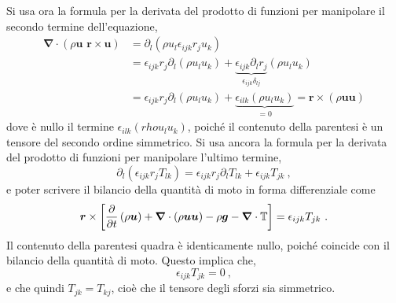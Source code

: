 \noindent
Si usa ora la formula per la derivata del prodotto di funzioni per manipolare il secondo termine dell'equazione,
\begin{equation}
\begin{aligned}
  \bm{\nabla} \cdot \left( \rho \bm{u} \,\,  \bm{r} \times \bm{u} \right) & =
  \partial_l \left( \rho u_l \epsilon_{ijk} r_j u_k \right) \\
  & = \epsilon_{ijk} r_j \partial_l \left( \rho u_l u_k \right) +
      \underbrace{\epsilon_{ijk} \partial_l r_j}_{\epsilon_{ijk} \delta_{lj}} \left( \rho u_l u_k \right) \\
  & = \epsilon_{ijk} r_j \partial_l \left( \rho u_l u_k \right) +
      \underbrace{\epsilon_{ilk} \left( \rho u_l u_k \right)}_{ = 0 } 
  = \bm{r} \times \left( \rho \bm{u} \bm{u} \right)
\end{aligned}
\end{equation}
dove è nullo il termine $\epsilon_{ilk} \left(rho u_l u_k \right)$, poiché il contenuto della parentesi è un tensore del secondo ordine simmetrico. Si usa ancora la formula per la derivata del prodotto di funzioni per manipolare l'ultimo termine,
\begin{equation}
 \partial_l( \epsilon_{ijk} r_j T_{lk} ) = \epsilon_{ijk} r_j \partial_l T_{lk} + 
  \epsilon_{ijk} T_{jk} \ ,
\end{equation}
e poter scrivere il bilancio della quantità di moto in forma differenziale come
\begin{equation}
 \bm{r} \times \left[ \dfrac{\partial{}}{\partial{t}} \left( \rho \bm{u} \right) + \bm{\nabla} \cdot \left( \rho \bm{u} \bm{u} \right) - \rho \bm{g} - \bm{\nabla} \cdot \mathbb{T} \right] = \epsilon_{ijk} T_{jk} \ .
\end{equation}
Il contenuto della parentesi quadra è identicamente nullo, poiché coincide con il bilancio della quantità di moto. Questo implica che,
\begin{equation}
  \epsilon_{ijk} T_{jk} = 0 \ ,
\end{equation}
e che quindi $T_{jk} = T_{kj}$, cioè che il tensore degli sforzi sia simmetrico.


